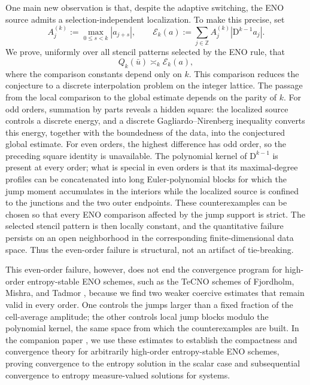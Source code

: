 \documentclass[11pt]{amsart}
\theoremstyle{plain}
\theoremstyle{definition}
\theoremstyle{remark}
\numberwithin{equation}{section}
\theoremstyle{plain}
\begin{document}
One main new observation is that, despite the adaptive switching, the ENO
source admits a selection-independent localization.  To make this precise, set
\[
A_j^{(k)}:=\max_{0\le s<k}|a_{j+s}|,
\qquad
\mathcal E_k(a):=
\sum_{j\in\mathbb Z}A_j^{(k)}
|\mathrm D^{k-1}a_j|.
\]
We prove, uniformly over all stencil patterns selected by the ENO
rule, that
\begin{equation}\label{eq:intro-selection-free-source}
	Q_k(\bar u)\asymp_k\mathcal E_k(a),
\end{equation}
where the comparison constants depend only on $k$.  This comparison
reduces the conjecture to a discrete interpolation problem on the
integer lattice.  The passage from the local comparison to the global
estimate depends on the parity of $k$.  For odd orders, summation by
parts reveals a hidden square: the localized source controls a
discrete energy, and a discrete Gagliardo--Nirenberg inequality
converts this energy, together with the boundedness of the data, into
the conjectured global estimate.  For even orders, the highest
difference has odd order, so the preceding square identity is
unavailable.  The polynomial kernel of
$\mathrm D^{k-1}$ is present at every order; what is special in even
orders is that its maximal-degree profiles can be concatenated into
long Euler-polynomial blocks for which the jump moment accumulates in
the interiors while the localized source is confined to the junctions
and the two outer endpoints. 
These counterexamples can be chosen so that every ENO comparison
affected by the jump support is strict.  The
selected stencil pattern is then locally constant, and the
quantitative failure persists on an open neighborhood in the
corresponding finite-dimensional data space.  Thus the even-order
failure is structural, not an artifact of tie-breaking.   

This even-order failure, however, does not end the convergence program for high-order 
entropy-stable ENO schemes, such as the TeCNO schemes of Fjordholm,
Mishra, and Tadmor \cite{FMTtecno,FjordholmThesis}, because we
find two weaker coercive estimates that remain valid in every
order.  One controls the jumps larger than a fixed fraction of the
cell-average amplitude; the other controls local jump blocks modulo
the polynomial kernel, the same space from which the counterexamples
are built.  In the companion paper \cite{LiWuCompanion}, we use these estimates to establish the compactness and convergence theory for arbitrarily high-order entropy-stable ENO schemes, proving convergence to the entropy solution in the scalar case and subsequential convergence to entropy measure-valued solutions for systems.
\end{document}
